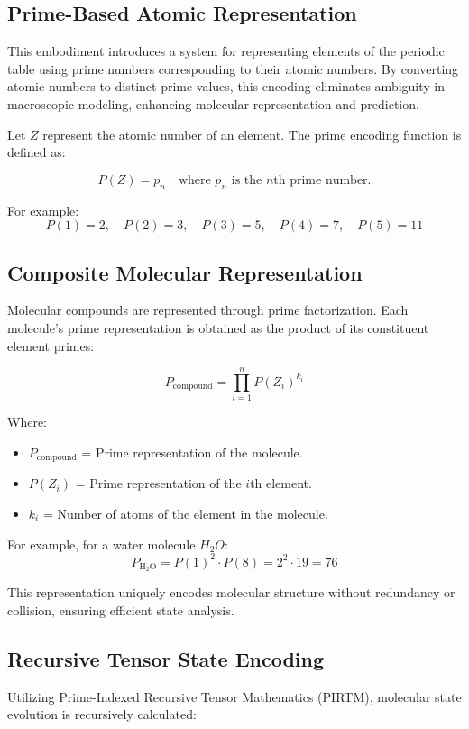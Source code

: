 \documentclass{article}
\theoremstyle{plain}
\theoremstyle{claimstyle}
\begin{document}
\subsection{Prime-Based Atomic Representation}
This embodiment introduces a system for representing elements of the periodic table using prime numbers corresponding to their atomic numbers. By converting atomic numbers to distinct prime values, this encoding eliminates ambiguity in macroscopic modeling, enhancing molecular representation and prediction.

Let \( Z \) represent the atomic number of an element. The prime encoding function is defined as:

\[
P(Z) = p_n \quad \text{where } p_n \text{ is the } n\text{th prime number}.
\]

For example:
\[
P(1) = 2, \quad P(2) = 3, \quad P(3) = 5, \quad P(4) = 7, \quad P(5) = 11
\]

\subsection{Composite Molecular Representation}
Molecular compounds are represented through prime factorization. Each molecule's prime representation is obtained as the product of its constituent element primes:

\[
P_{\text{compound}} = \prod_{i=1}^{n} P(Z_i)^{k_i}
\]

Where:
\begin{itemize}
    \item \( P_{\text{compound}} \) = Prime representation of the molecule.
    \item \( P(Z_i) \) = Prime representation of the \(i\)th element.
    \item \( k_i \) = Number of atoms of the element in the molecule.
\end{itemize}

For example, for a water molecule \( H_2O \):
\[
P_{\text{H}_2\text{O}} = P(1)^2 \cdot P(8) = 2^2 \cdot 19 = 76
\]

This representation uniquely encodes molecular structure without redundancy or collision, ensuring efficient state analysis.

\subsection{Recursive Tensor State Encoding}
Utilizing Prime-Indexed Recursive Tensor Mathematics (PIRTM), molecular state evolution is recursively calculated:
\end{document}
